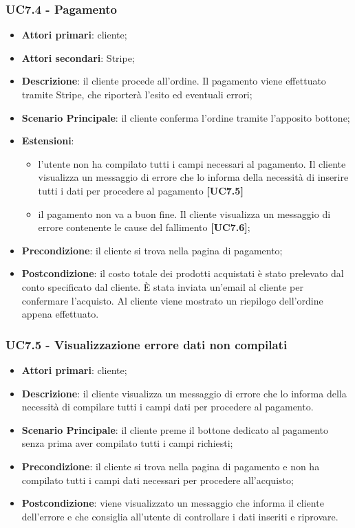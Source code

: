 \subsubsection{UC7.4 - Pagamento}
\begin{itemize}
\item \textbf{Attori primari}: cliente;
\item \textbf{Attori secondari}: Stripe;
\item \textbf{Descrizione}: il cliente procede all'ordine. Il pagamento viene effettuato tramite Stripe, che riporterà l'esito ed eventuali errori;
\item \textbf{Scenario Principale}: il cliente conferma l'ordine tramite l'apposito bottone;
\item \textbf{Estensioni}:
\begin{itemize}
	\item l'utente non ha compilato tutti i campi necessari al pagamento. Il cliente visualizza un messaggio di errore che lo informa della necessità di inserire tutti i dati per procedere al pagamento \textbf{[UC7.5]}
	\item il pagamento non va a buon fine. Il cliente visualizza un messaggio di errore contenente le cause del fallimento \textbf{[UC7.6]};
\end{itemize}
\item \textbf{Precondizione}: il cliente si trova nella pagina di pagamento;
\item \textbf{Postcondizione}: il costo totale dei prodotti acquistati è stato prelevato dal conto specificato dal cliente. È stata inviata un'email al cliente per confermare l'acquisto. Al cliente viene mostrato un riepilogo dell'ordine appena effettuato.
\end{itemize}

\subsubsection{UC7.5 - Visualizzazione errore dati non compilati}
\begin{itemize}
\item \textbf{Attori primari}: cliente;
\item \textbf{Descrizione}: il cliente visualizza un messaggio di errore che lo informa della necessità di compilare tutti i campi dati per procedere al pagamento.
\item \textbf{Scenario Principale}: il cliente preme il bottone dedicato al pagamento senza prima aver compilato tutti i campi richiesti;
\item \textbf{Precondizione}: il cliente si trova nella pagina di pagamento e non ha compilato tutti i campi dati necessari per procedere all'acquisto;
\item \textbf{Postcondizione}: viene visualizzato un messaggio che informa il cliente dell'errore e che consiglia all'utente di controllare i dati inseriti e riprovare.
\end{itemize}

